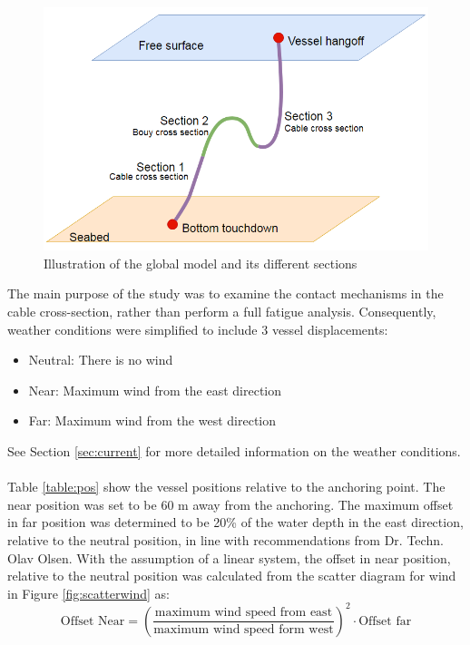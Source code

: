 \begin{figure}[H]
\centering
\includegraphics[scale=0.6]{figures/globalill}
\caption [$\; \:$Illustration of the global model]{Illustration of the global model and its different sections}
 \label{fig:globalill}
\end{figure}
\noindent The main purpose of the study was to examine the contact mechanisms in the cable cross-section, rather than perform a full fatigue analysis. Consequently,  weather conditions were simplified to include 3 vessel displacements:
\begin{itemize}
    \item Neutral: There is no wind
    \item Near: Maximum wind from the east direction
    \item Far: Maximum wind from the west direction
\end{itemize}
See Section \ref{sec:current} for more detailed information on the weather conditions. \\\\
Table \ref{table:pos} show the vessel positions relative to the anchoring point. The near position was set to be 60 m away from the anchoring. The maximum offset in far position was determined to be 20\% of the water depth in the east direction, relative to the neutral position, in line with recommendations from Dr. Techn. Olav Olsen. With the assumption of a linear system, the offset in near position, relative to the neutral position was calculated from the scatter diagram for wind in Figure \ref{fig:scatterwind} as:
\begin{equation}
    \text{Offset Near}=\left(\frac{\text{maximum  wind speed from east}}{\text{maximum wind speed form west}}\right)^2 \cdot \text{Offset far}
\end{equation}


